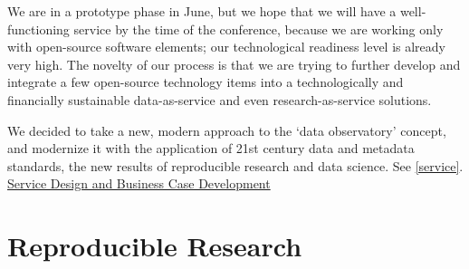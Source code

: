 \documentclass[
  a4paper,
  openany, a4paper, oneside]{book}
\begin{document}
We are in a prototype phase in June, but we hope that we will have a well-functioning service by the time of the conference, because we are working only with open-source software elements; our technological readiness level is already very high. The novelty of our process is that we are trying to further develop and integrate a few open-source technology items into a technologically and financially sustainable data-as-service and even research-as-service solutions.

We decided to take a new, modern approach to the `data observatory' concept, and modernize it with the application of 21st century data and metadata standards, the new results of reproducible research and data science. See \ref{service}. \protect\hyperlink{service}{Service Design and Business Case Development}

\hypertarget{reproducible-research}{%
\section{Reproducible Research}\label{reproducible-research}}
\end{document}
